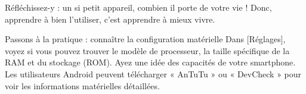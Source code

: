 Réfléchissez-y : un si petit appareil, combien il porte de votre vie ! Donc, apprendre à bien l'utiliser, c'est apprendre à mieux vivre.

\begin{tcbpractice}{Passons à la pratique : connaître la configuration matérielle}
Dans [Réglages], voyez si vous pouvez trouver le modèle de processeur, la taille spécifique de la RAM et du stockage (ROM). Ayez une idée des capacités de votre smartphone. Les utilisateurs Android peuvent télécharger « AnTuTu » ou « DevCheck » pour voir les informations matérielles détaillées.

\end{tcbpractice}
